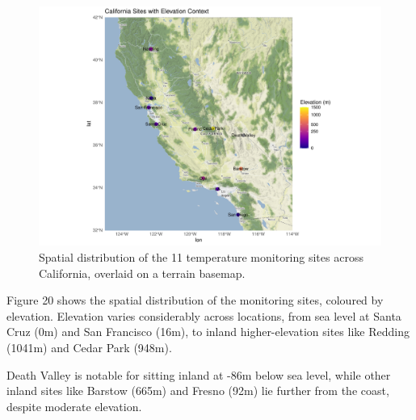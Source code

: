 \documentclass[
  11pt,
]{article}
\begin{document}
\begin{figure}[H]

{\centering \includegraphics{project_files/figure-pdf/ca_map_elevation-1.pdf}

}

\caption{Spatial distribution of the 11 temperature monitoring sites
across California, overlaid on a terrain basemap.}

\end{figure}%

Figure 20 shows the spatial distribution of the monitoring sites,
coloured by elevation. Elevation varies considerably across locations,
from sea level at Santa Cruz (0m) and San Francisco (16m), to inland
higher-elevation sites like Redding (1041m) and Cedar Park (948m).

Death Valley is notable for sitting inland at -86m below sea level,
while other inland sites like Barstow (665m) and Fresno (92m) lie
further from the coast, despite moderate elevation.
\end{document}
